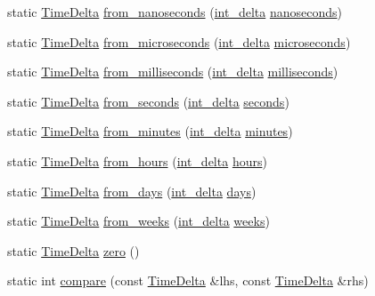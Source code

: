 \begin{DoxyCompactItemize}
\item 
static \hyperlink{structTimeDelta}{\-Time\-Delta} \hyperlink{structTimeDelta_abc1b517c2156b2d9627fd07d42aecb2f}{from\-\_\-nanoseconds} (\hyperlink{types_8h_a8a67cf99971c5cfeeaa2380ba84a4c92}{int\-\_\-delta} \hyperlink{structTimeDelta_a27608357ea9addd1d0da20918f91d500}{nanoseconds})
\item 
static \hyperlink{structTimeDelta}{\-Time\-Delta} \hyperlink{structTimeDelta_a32f3fa21ba37d81507383d001f3b704b}{from\-\_\-microseconds} (\hyperlink{types_8h_a8a67cf99971c5cfeeaa2380ba84a4c92}{int\-\_\-delta} \hyperlink{structTimeDelta_aa23b22a3b2a0f3f559e9dc343588b546}{microseconds})
\item 
static \hyperlink{structTimeDelta}{\-Time\-Delta} \hyperlink{structTimeDelta_a01e0919f444379030aa37559fa13542c}{from\-\_\-milliseconds} (\hyperlink{types_8h_a8a67cf99971c5cfeeaa2380ba84a4c92}{int\-\_\-delta} \hyperlink{structTimeDelta_a185b2278844ed43b2f5e1e8d16b11cb2}{milliseconds})
\item 
static \hyperlink{structTimeDelta}{\-Time\-Delta} \hyperlink{structTimeDelta_aad4311d8580ade36d8c567576630c967}{from\-\_\-seconds} (\hyperlink{types_8h_a8a67cf99971c5cfeeaa2380ba84a4c92}{int\-\_\-delta} \hyperlink{structTimeDelta_aa1fe6d8a690ab04b561400c09db673ef}{seconds})
\item 
static \hyperlink{structTimeDelta}{\-Time\-Delta} \hyperlink{structTimeDelta_a244bc3b143bfa760aa2b0cf350cf768c}{from\-\_\-minutes} (\hyperlink{types_8h_a8a67cf99971c5cfeeaa2380ba84a4c92}{int\-\_\-delta} \hyperlink{structTimeDelta_a2856a4e761fc83822cc6987655035e76}{minutes})
\item 
static \hyperlink{structTimeDelta}{\-Time\-Delta} \hyperlink{structTimeDelta_a912f6ceafac4b9252a1a5d76033754ea}{from\-\_\-hours} (\hyperlink{types_8h_a8a67cf99971c5cfeeaa2380ba84a4c92}{int\-\_\-delta} \hyperlink{structTimeDelta_a5135596cbf7f7ef40001e25c5aa880b3}{hours})
\item 
static \hyperlink{structTimeDelta}{\-Time\-Delta} \hyperlink{structTimeDelta_a9bb1a85b6f27ad8488ae06e238d5808e}{from\-\_\-days} (\hyperlink{types_8h_a8a67cf99971c5cfeeaa2380ba84a4c92}{int\-\_\-delta} \hyperlink{structTimeDelta_abad8a94a6c022af1a1871e452eca47ea}{days})
\item 
static \hyperlink{structTimeDelta}{\-Time\-Delta} \hyperlink{structTimeDelta_ae0f0a41d899e62b9d17bc4542c443ec6}{from\-\_\-weeks} (\hyperlink{types_8h_a8a67cf99971c5cfeeaa2380ba84a4c92}{int\-\_\-delta} \hyperlink{structTimeDelta_a4e583a79abea664691df4680f4fd467d}{weeks})
\item 
static \hyperlink{structTimeDelta}{\-Time\-Delta} \hyperlink{structTimeDelta_a2dec837a107c5e46e14b9c69557209fa}{zero} ()
\item 
static int \hyperlink{structTimeDelta_a1bee789870de5a374ee472ffa4bff172}{compare} (const \hyperlink{structTimeDelta}{\-Time\-Delta} \&lhs, const \hyperlink{structTimeDelta}{\-Time\-Delta} \&rhs)
\end{DoxyCompactItemize}
